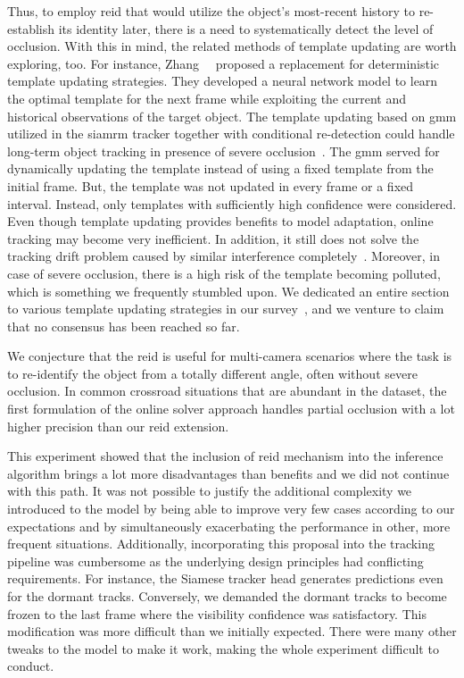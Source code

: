 Thus, to employ \gls{reid} that would utilize the object's most-recent history to re-establish its identity later, there is a need to systematically detect the level of occlusion. With this in mind, the related methods of template updating are worth exploring, too. For instance, Zhang~\etal{}~\cite{zhang2019learning} proposed a replacement for deterministic template updating strategies. They developed a neural network model to learn the optimal template for the next frame while exploiting the current and historical observations of the target object. The template updating based on \gls{gmm} utilized in the \gls{siamrm} tracker together with conditional re-detection could handle long-term object tracking in presence of severe occlusion~\cite{li2019siamrm}. The \gls{gmm} served for dynamically updating the template instead of using a fixed template from the initial frame. But, the template was not updated in every frame or a fixed interval. Instead, only templates with sufficiently high confidence were considered. Even though template updating provides benefits to model adaptation, online tracking may become very inefficient. In addition, it still does not solve the tracking drift problem caused by similar interference completely~\cite{guo2019siamcar}. Moreover, in case of severe occlusion, there is a high risk of the template becoming polluted, which is something we frequently stumbled upon. We dedicated an entire section to various template updating strategies in our survey~\cite{ondrasovic2021siamese}, and we venture to claim that no consensus has been reached so far.

We conjecture that the \gls{reid} is useful for multi-camera scenarios where the task is to re-identify the object from a totally different angle, often without severe occlusion. In common crossroad situations that are abundant in the \uadetrac{} dataset, the first formulation of the online solver approach handles partial occlusion with a lot higher precision than our \gls{reid} extension.

This experiment showed that the inclusion of \gls{reid} mechanism into the inference algorithm brings a lot more disadvantages than benefits and we did not continue with this path. It was not possible to justify the additional complexity we introduced to the model by being able to improve very few cases according to our expectations and by simultaneously exacerbating the performance in other, more frequent situations. Additionally, incorporating this proposal into the tracking pipeline was cumbersome as the underlying design principles had conflicting requirements. For instance, the Siamese tracker head generates predictions even for the dormant tracks. Conversely, we demanded the dormant tracks to become frozen to the last frame where the visibility confidence was satisfactory. This modification was more difficult than we initially expected. There were many other tweaks to the model to make it work, making the whole experiment difficult to conduct.

